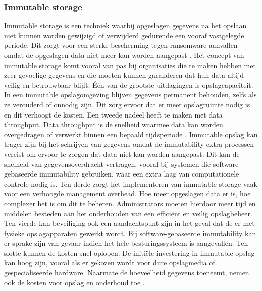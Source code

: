 \subsubsection{Immutable storage}
Immutable storage is een techniek waarbij opgeslagen gegevens na het opslaan niet kunnen worden gewijzigd of verwijderd gedurende een vooraf vastgelegde periode. Dit zorgt voor een sterke bescherming tegen ransomware-aanvallen omdat de opgeslagen data niet meer kan worden aangepast \autocite{Wahl2023}. Het concept van immutable storage komt vooral van pas bij organisaties die te maken hebben met zeer gevoelige gegevens en die moeten kunnen garanderen dat hun data altijd veilig en betrouwbaar blijft. Één van de grootste uitdagingen is opslagcapaciteit. In een immutable opslagomgeving blijven gegevens permanent behouden, zelfs als ze verouderd of onnodig zijn. Dit zorg ervoor dat er meer opslagruimte nodig is en dit verhoogt de kosten. Een tweede nadeel heeft te maken met data throughput. Data throughput is de snelheid waarmee data kan worden overgedragen of verwerkt binnen een bepaald tijdsperiode \autocite{Miao2016}. Immutable opslag kan trager zijn bij het schrijven van gegevens omdat de immutability extra processen vereist om ervoor te zorgen dat data niet kan worden aangepast. Dit kan de snelheid van gegevensoverdracht vertragen, vooral bij systemen die software-gebaseerde immutability gebruiken, waar een extra laag van computationele controle nodig is. Ten derde zorgt het implementeren  van immutable storage vaak voor een verhoogde management overhead. Hoe meer opgeslagen data er is, hoe complexer het is om dit te beheren. Administrators moeten hierdoor meer tijd en middelen besteden aan het onderhouden van een efficiënt en veilig opslagbeheer. Ten vierde kan beveiliging ook een aandachtspunt zijn in het geval dat de er met fysieke opslagapparaten gewerkt wordt. Bij software-gebaseerde immutability kan er sprake zijn van gevaar indien het hele besturingssysteem is aangevallen. Ten slotte kunnen de kosten snel oplopen. De initiële investering in immutable opslag kan hoog zijn, vooral als er gekozen wordt voor dure opslagmedia of gespecialiseerde hardware. Naarmate de hoeveelheid gegevens toeneemt, nemen ook de kosten voor opslag en onderhoud toe \autocite{Hasan2005}.

